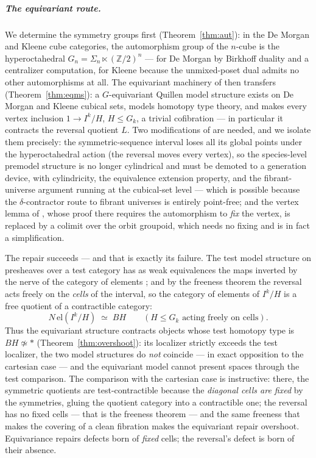 \documentclass[11pt]{amsart}
\theoremstyle{definition}
\newcommand{\G}{G}
\newcommand{\el}{\mathrm{el}}
\newcommand{\Ldash}{L}
\begin{document}
\subparagraph*{The equivariant route.}
\sloppy We determine the symmetry groups first (Theorem~\ref{thm:aut}): in the De Morgan and Kleene
cube categories, the automorphism group of the $n$-cube is the
hyperoctahedral $\G_n = \Sigma_n \ltimes (\mathbb{Z}/2)^n$
--- for De Morgan by Birkhoff duality and a centralizer
computation, for Kleene because the unmixed-poset dual admits no
other automorphisms at all.  The equivariant machinery of
\cite{ACCRS} then transfers (Theorem~\ref{thm:eqms}): a
$\G$-equivariant Quillen model structure exists on De Morgan and
Kleene cubical sets, models homotopy type theory, and makes every
vertex inclusion $1 \to I^k/H$, $H \leq \G_k$, a trivial
cofibration --- in particular it contracts the reversal quotient
$\Ldash$.  Two modifications of \cite{ACCRS} are needed, and we
isolate them precisely: the symmetric-sequence interval loses all
its global points under the hyperoctahedral action (the reversal
moves every vertex), so the species-level premodel structure is no
longer cylindrical and must be demoted to a generation device,
with cylindricity, the equivalence extension property, and the
fibrant-universe argument running at the cubical-set level ---
which is possible because the $\delta$-contractor route to fibrant
universes is entirely point-free; and the vertex lemma of
\cite{ACCRS}, whose proof there requires the automorphism to
\emph{fix} the vertex, is replaced by a colimit over the orbit
groupoid, which needs no fixing and is in fact a simplification.

The repair succeeds --- and that is exactly its failure.  The test
model structure on presheaves over a test category has as weak
equivalences the maps inverted by the nerve of the category of
elements \cite{Cisinski, ACCRS}; and by the freeness theorem the
reversal acts freely on the \emph{cells} of the interval, so the
category of elements of $I^k/H$ is a free quotient of a
contractible category:
\[
  N\,\el(I^k/H) \;\simeq\; BH
  \qquad (\text{$H \leq \G_k$ acting freely on cells}).
\]
Thus the equivariant structure contracts objects whose test
homotopy type is $BH \not\simeq *$
(Theorem~\ref{thm:overshoot}): its localizer strictly exceeds the
test localizer, the two model structures do \emph{not} coincide ---
in exact opposition to the cartesian case
\cite[Thm.~6.3.6]{ACCRS} --- and the equivariant model cannot
present spaces through the test comparison.  The comparison with
the cartesian case is instructive: there, the symmetric quotients
are test-contractible because the \emph{diagonal cells are fixed}
by the symmetries, gluing the quotient category into a contractible
one; the reversal has no fixed cells --- that is the freeness
theorem --- and the same freeness that makes the covering of
\cite{Reversal} a clean fibration makes the equivariant repair
overshoot.  Equivariance repairs defects born of \emph{fixed}
cells; the reversal's defect is born of their absence.
\end{document}
